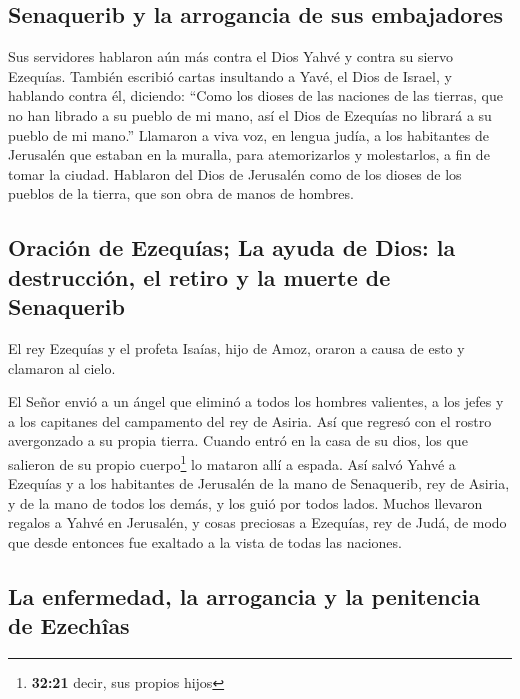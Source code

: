 \hypertarget{senaquerib-y-la-arrogancia-de-sus-embajadores}{%
\subsection{Senaquerib y la arrogancia de sus
embajadores}\label{senaquerib-y-la-arrogancia-de-sus-embajadores}}

 Sus servidores hablaron aún más contra el Dios Yahvé y
contra su siervo Ezequías.  También escribió cartas
insultando a Yavé, el Dios de Israel, y hablando contra él, diciendo:
``Como los dioses de las naciones de las tierras, que no han librado a
su pueblo de mi mano, así el Dios de Ezequías no librará a su pueblo de
mi mano.''  Llamaron a viva voz, en lengua judía, a los
habitantes de Jerusalén que estaban en la muralla, para atemorizarlos y
molestarlos, a fin de tomar la ciudad.  Hablaron del Dios
de Jerusalén como de los dioses de los pueblos de la tierra, que son
obra de manos de hombres.

\hypertarget{oraciuxf3n-de-ezequuxedas-la-ayuda-de-dios-la-destrucciuxf3n-el-retiro-y-la-muerte-de-senaquerib}{%
\subsection{Oración de Ezequías; La ayuda de Dios: la destrucción, el
retiro y la muerte de
Senaquerib}\label{oraciuxf3n-de-ezequuxedas-la-ayuda-de-dios-la-destrucciuxf3n-el-retiro-y-la-muerte-de-senaquerib}}

 El rey Ezequías y el profeta Isaías, hijo de Amoz,
oraron a causa de esto y clamaron al cielo.

 El Señor envió a un ángel que eliminó a todos los
hombres valientes, a los jefes y a los capitanes del campamento del rey
de Asiria. Así que regresó con el rostro avergonzado a su propia tierra.
Cuando entró en la casa de su dios, los que salieron de su propio
cuerpo\footnote{\textbf{32:21} decir, sus propios hijos} lo mataron allí
a espada.  Así salvó Yahvé a Ezequías y a los habitantes
de Jerusalén de la mano de Senaquerib, rey de Asiria, y de la mano de
todos los demás, y los guió por todos lados.  Muchos
llevaron regalos a Yahvé en Jerusalén, y cosas preciosas a Ezequías, rey
de Judá, de modo que desde entonces fue exaltado a la vista de todas las
naciones.

\hypertarget{la-enfermedad-la-arrogancia-y-la-penitencia-de-ezechuxeeas}{%
\subsection{La enfermedad, la arrogancia y la penitencia de
Ezechîas}\label{la-enfermedad-la-arrogancia-y-la-penitencia-de-ezechuxeeas}}

